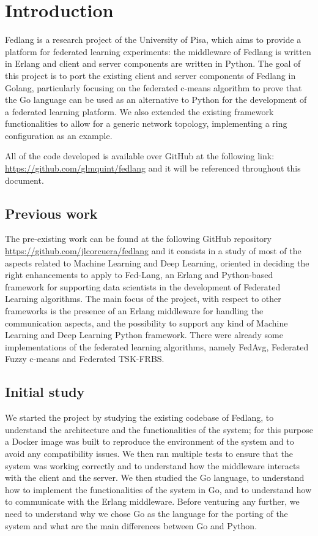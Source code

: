 \chapter{Introduction}
Fedlang is a research project of the University of Pisa, which aims to provide a platform for federated learning experiments:
the middleware of Fedlang is written in Erlang and client and server components are written in Python.
The goal of this project is to port the existing client and server components of Fedlang in Golang, particularly focusing on the federated c-means algorithm to prove that the Go language can be used as an alternative to Python for the development of a federated learning platform. 
We also extended the existing framework functionalities to allow for a generic network topology, implementing a ring configuration as an example.

All of the code developed is available over GitHub at the following link: \url{https://github.com/glmquint/fedlang} and it will be referenced throughout this document.

\section{Previous work}
The pre-existing work can be found at the following GitHub repository \url{https://github.com/jlcorcuera/fedlang} and it consists in a study of most of the aspects related to Machine Learning and Deep Learning, oriented in deciding the right enhancements to apply to Fed-Lang, an Erlang and Python-based framework for supporting data scientists in the development of Federated Learning algorithms. The main focus of the project, with respect to other frameworks is the presence of an Erlang middleware for handling the communication aspects, and the possibility to support any kind of Machine Learning and Deep Learning Python framework. There were already some implementations of the federated learning algorithms, namely FedAvg, Federated Fuzzy c-means and Federated TSK-FRBS.

\section{Initial study}
We started the project by studying the existing codebase of Fedlang, to understand the architecture and the functionalities of the system; for this purpose a Docker image was built to reproduce the environment of the system and to avoid any compatibility issues.
We then ran multiple tests to ensure that the system was working correctly and to understand how the middleware interacts with the client and the server. 
We then studied the Go language, to understand how to implement the functionalities of the system in Go, and to understand how to communicate with the Erlang middleware. Before venturing any further, we need to understand why we chose Go as the language for the porting of the system and what are the main differences between Go and Python.

